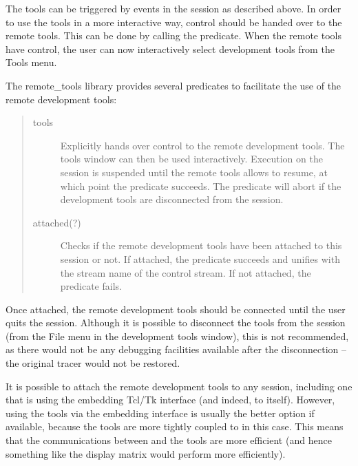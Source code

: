 The tools can be triggered by events in the {\eclipse} session as described
above. In order to use the tools in a more interactive way, control should
be handed over to the remote tools. This can be done by calling the
 predicate.
When the remote tools have control, the user can
now interactively select development tools from the Tools menu.

The remote_tools library provides several predicates to facilitate the use
of the remote development tools:

\begin{quote}
\begin{description}
\item[tools] Explicitly hands over control to the remote
development
tools. The tools window can then be used interactively. Execution on the
{\eclipse} session is suspended until the remote tools allows {\eclipse} to
resume, at which point the predicate succeeds. The predicate will abort if
the development tools are disconnected from the {\eclipse} session.

\item[attached(?)]
	Checks if the remote development tools have been attached to this
        {\eclipse} session or not. If attached, the predicate succeeds and
        unifies  with the stream name of the control
        stream. If not attached, the  predicate fails.

\end{description}
\end{quote}

Once attached, the remote development tools should be connected until the
user quits the session. Although it is possible to disconnect the tools
from the {\eclipse} session (from the File menu in the development tools
window), this is not recommended, as there would not be any debugging
facilities available after the disconnection -- the original tracer would
not be restored.

It is possible to attach the remote development tools to any {\eclipse}
session, including one that is using the embedding Tcl/Tk interface (and
indeed, to {\tkeclipse} itself). However, using the tools via the embedding
interface is usually the better option if available, because the tools are
more tightly coupled to {\eclipse} in this case. This means that the
communications between {\eclipse} and the tools are more efficient (and
hence something like the display matrix would perform more efficiently).



